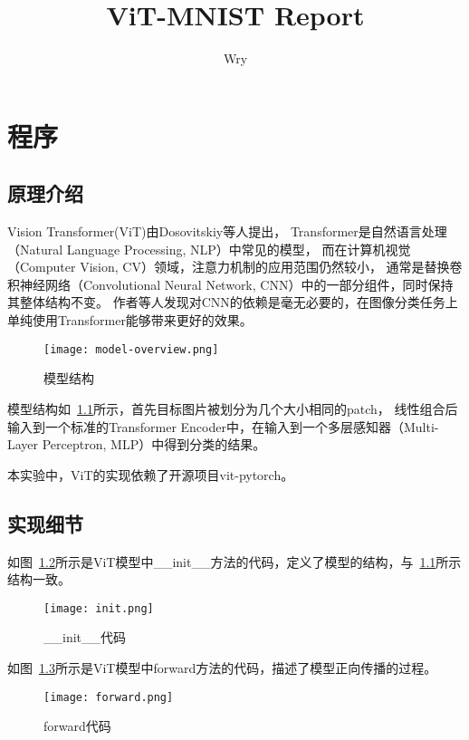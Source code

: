 \documentclass[UTF8]{ctexrep}
\title{ViT-MNIST Report}
\author{Wry}
\begin{document}
\maketitle

\chapter{程序}
\section{原理介绍}
Vision Transformer(ViT)由Dosovitskiy等人\cite{dosovitskiy2021an}提出，
Transformer是自然语言处理（Natural Language Processing, NLP）中常见的模型，
而在计算机视觉（Computer Vision, CV）领域，注意力机制的应用范围仍然较小，
通常是替换卷积神经网络（Convolutional Neural Network, CNN）中的一部分组件，同时保持其整体结构不变。
作者等人发现对CNN的依赖是毫无必要的，在图像分类任务上单纯使用Transformer能够带来更好的效果。

\begin{figure}[htbp]
    \centering
    \texttt{[image: model-overview.png]}
    \caption{模型结构}
    \label{fig:model-overview}
\end{figure}

模型结构如~\ref{fig:model-overview}所示，首先目标图片被划分为几个大小相同的patch，
线性组合后输入到一个标准的Transformer Encoder中，在输入到一个多层感知器（Multi-Layer Perceptron, MLP）中得到分类的结果。

本实验中，ViT的实现依赖了开源项目vit-pytorch\cite{vit-torch}。

\section{实现细节}
如图~\ref{fig:init}所示是ViT模型中\_\_init\_\_方法的代码，定义了模型的结构，与~\ref{fig:model-overview}所示结构一致。

\begin{figure}[htbp]
    \centering
    \texttt{[image: init.png]}
    \caption{\_\_init\_\_代码}
    \label{fig:init}
\end{figure}

如图~\ref{fig:forward}所示是ViT模型中forward方法的代码，描述了模型正向传播的过程。

\begin{figure}[htbp]
    \centering
    \texttt{[image: forward.png]}
    \caption{forward代码}
    \label{fig:forward}
\end{figure}
\end{document}
